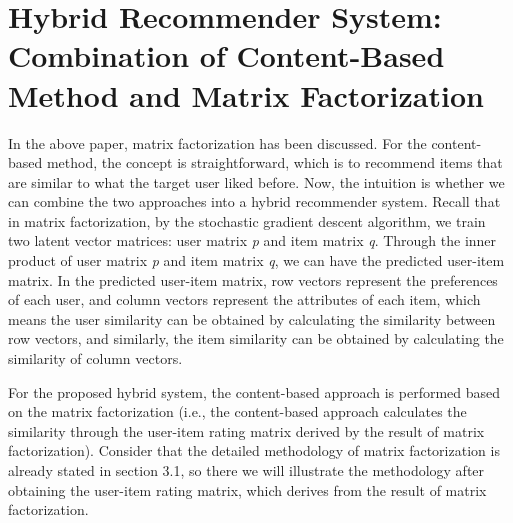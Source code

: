 \section{Hybrid Recommender System: Combination of Content-Based Method and Matrix Factorization}
In the above paper, matrix factorization has been discussed. For the content-based method, the concept is straightforward, which is to recommend items that are similar to what the target user liked before. Now, the intuition is whether we can combine the two approaches into a hybrid recommender system. Recall that in matrix factorization, by the stochastic gradient descent algorithm, we train two latent vector matrices: user matrix \textit{p} and item matrix \textit{q}. Through the inner product of user matrix \textit{p} and item matrix \textit{q}, we can have the predicted user-item matrix. In the predicted user-item matrix, row vectors represent the preferences of each user, and column vectors represent the attributes of each item, which means the user similarity can be obtained by calculating the similarity between row vectors, and similarly, the item similarity can be obtained by calculating the similarity of column vectors.

For the proposed hybrid system, the content-based approach is performed based on the matrix factorization (i.e., the content-based approach calculates the similarity through the user-item rating matrix derived by the result of matrix factorization). Consider that the detailed methodology of matrix factorization is already stated in section 3.1, so there we will illustrate the methodology after obtaining the user-item rating matrix, which derives from the result of matrix factorization.

